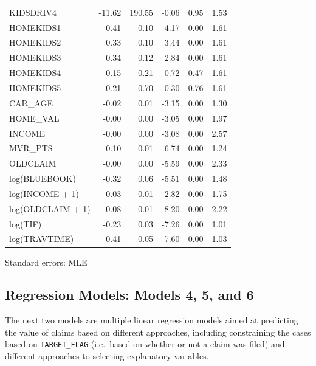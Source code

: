 \documentclass[]{article}
\begin{document}
\begin{table}[!h]
\begin{threeparttable}
\begin{tabular}{lrrrrr}
\rowcolor{gray!6}  KIDSDRIV4 & -11.62 & 190.55 & -0.06 & 0.95 & 1.53\\
HOMEKIDS1 & 0.41 & 0.10 & 4.17 & 0.00 & 1.61\\
\rowcolor{gray!6}  HOMEKIDS2 & 0.33 & 0.10 & 3.44 & 0.00 & 1.61\\
HOMEKIDS3 & 0.34 & 0.12 & 2.84 & 0.00 & 1.61\\
\addlinespace
\rowcolor{gray!6}  HOMEKIDS4 & 0.15 & 0.21 & 0.72 & 0.47 & 1.61\\
HOMEKIDS5 & 0.21 & 0.70 & 0.30 & 0.76 & 1.61\\
\rowcolor{gray!6}  CAR\_AGE & -0.02 & 0.01 & -3.15 & 0.00 & 1.30\\
HOME\_VAL & -0.00 & 0.00 & -3.05 & 0.00 & 1.97\\
\rowcolor{gray!6}  INCOME & -0.00 & 0.00 & -3.08 & 0.00 & 2.57\\
\addlinespace
MVR\_PTS & 0.10 & 0.01 & 6.74 & 0.00 & 1.24\\
\rowcolor{gray!6}  OLDCLAIM & -0.00 & 0.00 & -5.59 & 0.00 & 2.33\\
log(BLUEBOOK) & -0.32 & 0.06 & -5.51 & 0.00 & 1.48\\
\rowcolor{gray!6}  log(INCOME + 1) & -0.03 & 0.01 & -2.82 & 0.00 & 1.75\\
log(OLDCLAIM + 1) & 0.08 & 0.01 & 8.20 & 0.00 & 2.22\\
\addlinespace
\rowcolor{gray!6}  log(TIF) & -0.23 & 0.03 & -7.26 & 0.00 & 1.01\\
log(TRAVTIME) & 0.41 & 0.05 & 7.60 & 0.00 & 1.03\\
\bottomrule
\end{tabular}
\begin{tablenotes}
\item Standard errors: MLE
\end{tablenotes}
\end{threeparttable}
\end{table}

\newpage

\subsection{Regression Models: Models 4, 5, and
6}\label{regression-models-models-4-5-and-6}

The next two models are multiple linear regression models aimed at
predicting the value of claims based on different approaches, including
constraining the cases based on \texttt{TARGET\_FLAG} (i.e.~based on
whether or not a claim was filed) and different approaches to selecting
explanatory variables.
\end{document}
